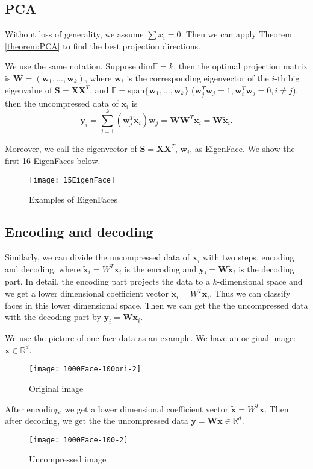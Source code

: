 \subsection{PCA}
Without loss of generality, we assume $\sum x_i=0$. Then we can apply Theorem \ref{theorem:PCA} to find the best projection directions. 

	We use the same notation. Suppose  $\text{dim}\mathbb F = k$, then the optimal projection matrix is $\mathbf{W}=(\mathbf{w}_1,...,\mathbf{w}_k)$, where $\mathbf{w}_i$ is the corresponding eigenvector of the $i$-th big eigenvalue of $\mathbf S=\mathbf X\mathbf X^T$, and $\mathbb F=\text{span}\{\mathbf{w}_1,...,\mathbf{w}_k\}$ ($\mathbf{w}_j^T\mathbf{w}_j=1,\mathbf{w}_i^T\mathbf{w}_j=0, i\neq j$), then the uncompressed data of $\mathbf x_i$ is
	\begin{equation}
		\mathbf{y}_i=\sum_{j=1}^{k}(\mathbf{w}_j^T \mathbf{x}_i)\mathbf{w}_j=\mathbf W\mathbf W^T\mathbf x_i=\mathbf W \tilde{\mathbf x}_i.
	\end{equation}

Moreover, we call the eigenvector of $\mathbf S=\mathbf X\mathbf X^T$, $\mathbf{w}_i$, as EigenFace.  We show the first 16 EigenFaces below. 
\begin{figure}
\begin{center}
\texttt{[image: 15EigenFace]} 
\caption{Examples of EigenFaces}
\end{center}
\end{figure}

\subsection{Encoding and decoding}
Similarly, we can divide the uncompressed data of $\mathbf x_i$ with two steps, encoding and decoding, where $\tilde{\mathbf x}_i=W^T\mathbf x_i$ is the encoding and $\mathbf{y}_i=\mathbf W \tilde{\mathbf x}_i$ is the decoding part. In detail, the encoding part projects the data to a $k$-dimensional space and we get a lower dimensional coefficient vector $\tilde{\mathbf x}_i=W^T\mathbf x_i$. Thus we can classify faces in this lower dimensional space. Then we can get the the uncompressed data with the decoding part by $\mathbf{y}_i=\mathbf W \tilde{\mathbf x}_i$.

We use the picture of one face data as an example. 
We have an original image: $\mathbf x\in \mathbb{R}^{d}$.
\begin{figure}
\begin{center}
\texttt{[image: 1000Face-100ori-2]} 
\caption{Original image}
\end{center}
\end{figure}
\newpage
After encoding, we get a lower dimensional coefficient vector $\tilde{\mathbf x}=W^T\mathbf x$.
Then after decoding, we get the the uncompressed data
$\mathbf{y}=\mathbf W \tilde{\mathbf x} \in \mathbb{R}^{d}$.
\begin{figure}
\begin{center}
\texttt{[image: 1000Face-100-2]} 
\caption{Uncompressed image}
\end{center}
\end{figure}

